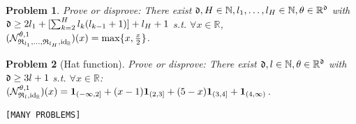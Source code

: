 \documentclass{article}
\newtheorem{problem}{Problem}
\begin{document}
\begin{enumerate}
\begin{itemize}
\begin{itemize}
\begin{itemize}
				\begin{problem}
					Prove or disprove: There exist ${\frak d},H\in\mathbb{N},l_1,\ldots,l_H\in\mathbb{N},\theta\in\mathbb{R}^{\frak d}$ with ${\frak d}\ge2l_1 + [\sum_{k=2}^H l_k(l_{k-1} + 1)] + l_H + 1$ s.t. $\forall x\in\mathbb{R}$, $({\cal N}_{{\frak R}_{l_1},\ldots,{\frak R}_{l_H},{\rm id}_\mathbb{R}}^{\theta,1})(x) = \max\{x,\frac{x}{2}\}$.
				\end{problem}
				
				\begin{problem}[Hat function]
					Prove or disprove: There exist ${\frak d},l\in\mathbb{N},\theta\in\mathbb{R}^{\frak d}$ with ${\frak d}\ge3l + 1$ s.t. $\forall x\in\mathbb{R}$: $({\cal N}_{{\frak R}_l,{\rm id}_\mathbb{R}}^{\theta,1})(x) = {\bf1}_{(-\infty,2]} + (x - 1){\bf1}_{(2,3]} + (5 - x){\bf1}_{(3,4]} + {\bf1}_{(4,\infty)}$.
				\end{problem}
				{\tt[MANY PROBLEMS]}
				

\end{itemize}
\end{itemize}
\end{itemize}
\end{enumerate}
\end{document}
